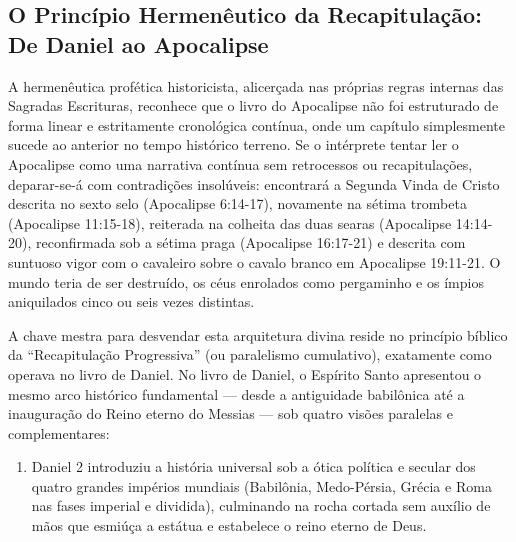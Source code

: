 \documentclass[11pt,a4paper,openany]{book}
\begin{document}
\subsection{O Princípio Hermenêutico da Recapitulação: De Daniel ao Apocalipse}


A hermenêutica profética historicista, alicerçada nas próprias regras internas das Sagradas Escrituras, reconhece que o livro do Apocalipse não foi estruturado de forma linear e estritamente cronológica contínua, onde um capítulo simplesmente sucede ao anterior no tempo histórico terreno. Se o intérprete tentar ler o Apocalipse como uma narrativa contínua sem retrocessos ou recapitulações, deparar-se-á com contradições insolúveis: encontrará a Segunda Vinda de Cristo descrita no sexto selo (Apocalipse 6:14-17), novamente na sétima trombeta (Apocalipse 11:15-18), reiterada na colheita das duas searas (Apocalipse 14:14-20), reconfirmada sob a sétima praga (Apocalipse 16:17-21) e descrita com suntuoso vigor com o cavaleiro sobre o cavalo branco em Apocalipse 19:11-21. O mundo teria de ser destruído, os céus enrolados como pergaminho e os ímpios aniquilados cinco ou seis vezes distintas.

A chave mestra para desvendar esta arquitetura divina reside no princípio bíblico da ``Recapitulação Progressiva'' (ou paralelismo cumulativo), exatamente como operava no livro de Daniel. No livro de Daniel, o Espírito Santo apresentou o mesmo arco histórico fundamental — desde a antiguidade babilônica até a inauguração do Reino eterno do Messias — sob quatro visões paralelas e complementares:
\begin{enumerate}
  \item Daniel 2 introduziu a história universal sob a ótica política e secular dos quatro grandes impérios mundiais (Babilônia, Medo-Pérsia, Grécia e Roma nas fases imperial e dividida), culminando na rocha cortada sem auxílio de mãos que esmiúça a estátua e estabelece o reino eterno de Deus.
\end{enumerate}
\end{document}
